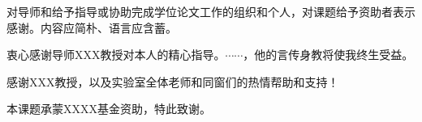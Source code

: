 
\begin{acknowledgements}

对导师和给予指导或协助完成学位论文工作的组织和个人，对课题给予资助者表示感谢。内容应简朴、语言应含蓄。

衷心感谢导师XXX教授对本人的精心指导。$\cdots\cdots$，他的言传身教将使我终生受益。

感谢XXX教授，以及实验室全体老师和同窗们的热情帮助和支持！

本课题承蒙XXXX基金资助，特此致谢。

\end{acknowledgements}

